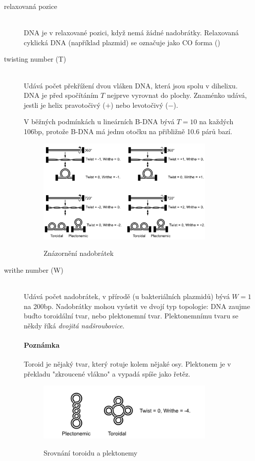 \documentclass[DIV=8]{scrreprt}
\newcommand{\mybox}[2]{
    \paragraph{#1} #2
}
\begin{document}
\begin{description}
\item[relaxovaná pozice]\hfill \\
DNA je v relaxované pozici, když nemá žádné nadobrátky. Relaxovaná cyklická DNA (například plazmid) se označuje jako CO forma ()


\item[twisting number (T)]\hfill \\
Udává počet překřížení dvou vláken DNA, která jsou spolu v dihelixu. DNA je před spočítáním \(T\) nejprve vyrovnat do plochy. Znaménko udává, jestli je helix pravotočivý (\(+\)) nebo levotočivý (\(-\)).

V běžných podmínkách u lineárních B-DNA bývá \(T = 10\) na každých 106bp, protože B-DNA má jednu otočku na přibližně 10.6 párů bazí. \begin{figure}
    \caption{Znázornění nadobrátek}
    \includegraphics[width=0.85\textwidth]{twist_and_writhe.png}
    \centering
    \label{}
\end{figure}



\item[writhe number (W)]\hfill \\
Udává počet nadobrátek, v přírodě (u bakteriálních plazmidů) bývá \(W = 1\) na 200bp. Nadobrátky mohou vyústit ve dvojí typ topologie: DNA zaujme buďto toroidální tvar, nebo plektonemní tvar. Plektonemnímu tvaru se někdy říká \emph{dvojitá nadšroubovice}.

\mybox{Poznámka}{Toroid je nějaký tvar, který rotuje kolem nějaké osy. Plektonem je v překladu "zkroucené vlákno" a vypadá spíše jako řetěz. \begin{figure}
    \caption{Srovnání toroidu a plektonemy}
    \includegraphics[width=0.85\textwidth]{toroid_plectoneme.png}
    \centering
    \label{}
\end{figure}
}



\end{description}
\end{document}
